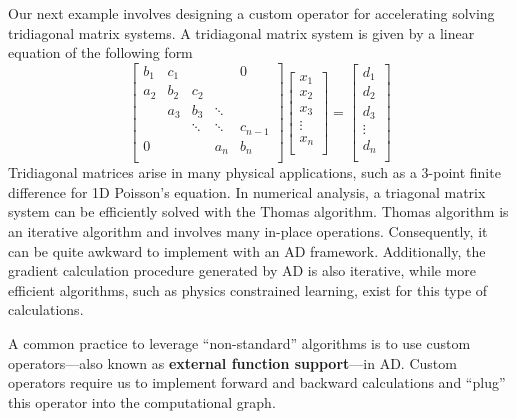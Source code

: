 \documentclass[3p,preprint,12pt]{elsarticle}
\begin{document}
Our next example involves designing a custom operator for accelerating solving tridiagonal matrix systems. A tridiagonal matrix system is given by a linear equation of the following form
\begin{equation}\label{equ:software-triproblem}
    \begin{bmatrix}
   {b_1} & {c_1} & {   } & {   } & { 0 } \\
   {a_2} & {b_2} & {c_2} & {   } & {   } \\
   {   } & {a_3} & {b_3} & \ddots & {   } \\
   {   } & {   } & \ddots & \ddots & {c_{n-1}}\\
   { 0 } & {   } & {   } & {a_n} & {b_n}\\
\end{bmatrix}
\begin{bmatrix}
   {x_1 }  \\
   {x_2 }  \\
   {x_3 }  \\
   \vdots   \\
   {x_n }  \\
\end{bmatrix}
=
\begin{bmatrix}
   {d_1 }  \\
   {d_2 }  \\
   {d_3 }  \\
   \vdots   \\
   {d_n }  \\
\end{bmatrix}
\end{equation}
Tridiagonal matrices arise in many physical applications, such as a 3-point finite difference for 1D Poisson's equation. In numerical analysis, a triagonal matrix system can be efficiently solved with the Thomas algorithm. Thomas algorithm is an iterative algorithm and involves many in-place operations. Consequently, it can be quite awkward to implement with an AD framework. Additionally, the gradient calculation procedure generated by AD is also iterative, while more efficient algorithms, such as physics constrained learning, exist for this type of calculations. 

A common practice to leverage ``non-standard'' algorithms is to use custom operators---also known as \textbf{external function support}---in AD. Custom operators require us to implement forward and backward calculations and ``plug'' this operator into the computational graph. 
\end{document}
